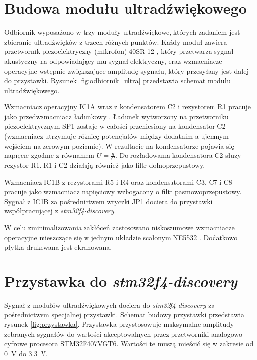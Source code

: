 \section{Budowa modułu ultradźwiękowego}

Odbiornik wyposażono w trzy moduły ultradźwiękowe, których zadaniem jest 
zbieranie ultradźwięków z trzech różnych  punktów.
Każdy moduł zawiera przetwornik piezoelektryczny (mikrofon) 40SR-12 \cite{bib:40ST12},
który przetwarza sygnał akustyczny na odpowiadający mu sygnał elektryczny, oraz wzmacniacze operacyjne 
wstępnie zwiększające amplitudę sygnału, który przesyłany jest dalej do przystawki.
Rysunek \ref{fig:odbiornik_ultra} przedstawia schemat modułu ultradźwiękowego.


Wzmacniacz operacyjny IC1A wraz z kondensatorem C2 i rezystorem R1 pracuje 
jako przedwzmacniacz ładunkowy \cite{bib:wzm_ladunkowy}.
Ładunek wytworzony na przetworniku piezoelektrycznym SP1 zostaje w całości przeniesiony na kondensator C2 
(wzmacniacz utrzymuje różnicę potencjałów między dodatnim a ujemnym wejściem na zerowym poziomie).
W rezultacie na kondensatorze pojawia się napięcie zgodnie z równaniem $U=\frac{q}{C}$.
Do rozładowania kondensatora C2 służy rezystor R1.
R1 i C2 działają również jako filtr dolnoprzepustowy.

Wzmacniacz IC1B z rezystorami R5 i R4 oraz kondensatorami C3, C7 i C8 pracuje jako wzmacniacz napięciowy wzbogacony o 
filtr pasmowoprzepustowy.
Sygnał z IC1B za pośrednictwem wtyczki JP1 dociera do przystawki współpracującej z \textit{stm32f4-discovery}.

W celu zminimalizowania zakłóceń zastosowano niskoszumowe wzmacniacze operacyjne
mieszczące się w jednym układzie scalonym NE5532 \cite{bib:ne5532}. 
Dodatkowo płytka drukowana jest ekranowana.


\section{Przystawka do \textit{stm32f4-discovery}}

Sygnał z modułów ultradźwiękowych dociera do \textit{stm32f4-discovery} za pośrednictwem specjalnej przystawki.
Schemat budowy przystawki przedstawia rysunek \ref{fig:przystawka}.
Przystawka przystosowuje maksymalne amplitudy zebranych sygnałów do wartości akceptowalnych przez  
przetworniki analogowo-cyfrowe procesora STM32F407VGT6.
Wartości te muszą mieścić się w zakresie od \SI{0}{V} do \SI{3,3}{V}.


